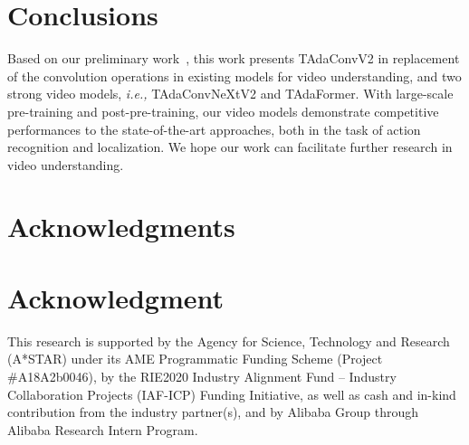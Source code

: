 \documentclass[10pt,journal,compsoc]{IEEEtran}
\begin{document}
\section{Conclusions}
Based on our preliminary work~\cite{huangtada}, this work presents TAdaConvV2 in replacement of the convolution operations in existing models for video understanding, and two strong video models, \textit{i.e.,} TAdaConvNeXtV2 and TAdaFormer. With large-scale pre-training and post-pre-training, our video models demonstrate competitive performances to the state-of-the-art approaches, both in the task of action recognition and localization. We hope our work can facilitate further research in video understanding. 















































\ifCLASSOPTIONcompsoc
\section*{Acknowledgments}
\else
\section*{Acknowledgment}
\fi
This research is supported by the Agency for Science, Technology and Research (A*STAR) under its AME Programmatic Funding Scheme (Project \#A18A2b0046), by the RIE2020 Industry Alignment Fund – Industry Collaboration Projects (IAF-ICP) Funding Initiative, as well as cash and in-kind contribution from the industry partner(s), and by Alibaba Group through Alibaba Research Intern Program. 




\ifCLASSOPTIONcaptionsoff
  \newpage
\fi
\end{document}
